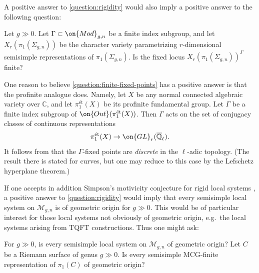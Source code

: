 A positive answer to \autoref{question:rigidity} would also imply a positive answer to the following question:
\begin{question}
\notready\label{question:finite-fixed-points}
Let $g\gg0$. Let $\Gamma\subset \on{Mod}_{g,n}$ be a finite index subgroup, and
let $X_r(\pi_1(\Sigma_{g,n}))$ be the character variety parametrizing
$r$-dimensional semisimple representations of $\pi_1(\Sigma_{g,n})$. Is the fixed locus  $X_r(\pi_1(\Sigma_{g,n}))^\Gamma$ finite?
\end{question}

\begin{remark}
\notready
One reason to believe \autoref{question:finite-fixed-points} has a positive answer is that the profinite analogue does. Namely, let $X$ be any normal connected algebraic variety over $\mathbb{C}$, and let $\pi_1^{\text{\'et}}(X)$ be its profinite fundamental group. Let $\Gamma$ be a finite index subgroup of $\on{Out}(\pi_1^{\text{\'et}}(X))$. Then $\Gamma$ acts on the set of conjugacy classes of continuous representations $$\pi_1^{\text{\'et}}(X)\to \on{GL}_r(\overline{\mathbb{Q}}_\ell).$$ It follows from \cite[Remark 1.1.4]{litt2021arithmetic} that the $\Gamma$-fixed points are \emph{discrete} in the $\ell$-adic topology. (The result there is stated for curves, but one may reduce to this case by the Lefschetz hyperplane theorem.)
\end{remark}



If one accepts in addition Simpson's motivicity conjecture for rigid local systems \cite[Conjecture on p.~9]{simpson1992higgs}, a positive answer to \autoref{question:rigidity} would imply that every semisimple local system on $\mathscr{M}_{g,n}$ is of geometric origin for $g\gg 0$. This would be of particular interest for those local systems not obviously of geometric origin, e.g.~the local systems arising from TQFT constructions.
Thus one might ask:

\begin{question}
\notready
For $g\gg 0$, is every semisimple local system on $\mathscr{M}_{g,n}$ of geometric origin? Let $C$ be a Riemann surface of genus $g\gg 0$. Is every semisimple MCG-finite representation of $\pi_1(C)$ of geometric origin?
\end{question}

